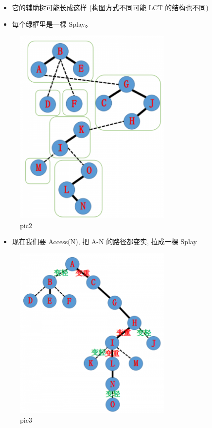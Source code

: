 \begin{itemize}
\item 它的辅助树可能长成这样 (构图方式不同可能 LCT 的结构也不同)
\item 每个绿框里是一棵 Splay。
\end{itemize}

\begin{figure}[htbp]
\centering
\includegraphics[width=0.7\textwidth]{docs/ds/images/lct2.png} 
\caption{pic2}
\end{figure}

\begin{itemize}
\item 现在我们要 Access(N), 把 A-N 的路径都变实, 拉成一棵 Splay
\end{itemize}

\begin{figure}[htbp]
\centering
\includegraphics[width=0.7\textwidth]{docs/ds/images/lct3.png} 
\caption{pic3}
\end{figure}

